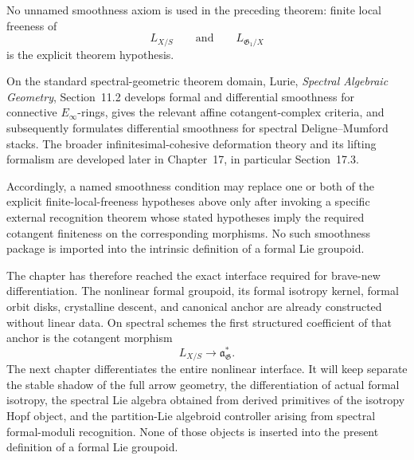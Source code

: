 \begin{remark}
\label{rem:standard-smooth-recognition}
No unnamed smoothness axiom is used in the preceding theorem:
finite local freeness of
\[
    L_{X/S}
    \qquad\text{and}\qquad
    L_{\mathfrak G_1/X}
\]
is the explicit theorem hypothesis.

On the standard spectral-geometric theorem domain, Lurie,
\emph{Spectral Algebraic Geometry}, Section~11.2 develops formal and
differential smoothness for connective $E_\infty$-rings, gives the relevant
affine cotangent-complex criteria, and subsequently formulates differential
smoothness for spectral Deligne--Mumford stacks.  The broader
infinitesimal-cohesive deformation theory and its lifting formalism are
developed later in Chapter~17, in particular Section~17.3.

Accordingly, a named smoothness condition may replace one or both of the
explicit finite-local-freeness hypotheses above only after invoking a
specific external recognition theorem whose stated hypotheses imply the
required cotangent finiteness on the corresponding morphisms.  No such
smoothness package is imported into the intrinsic definition of a formal Lie
groupoid.
\end{remark}

The chapter has therefore reached the exact interface required for
brave-new differentiation.  The nonlinear formal groupoid, its formal isotropy
kernel, formal orbit disks, crystalline descent, and canonical anchor are already
constructed without linear data.  On spectral schemes the first
structured coefficient of that anchor is the cotangent morphism
\[
    L_{X/S}\longrightarrow\mathfrak a_{\mathfrak G}^{*}.
\]
The next chapter differentiates the entire nonlinear interface.  It will keep
separate the stable shadow of the full arrow geometry, the differentiation
of actual formal isotropy, the spectral Lie algebra obtained from derived
primitives of the isotropy Hopf object, and the partition-Lie algebroid
controller arising from spectral formal-moduli recognition.  None of those
objects is inserted into the present definition of a formal Lie groupoid.

